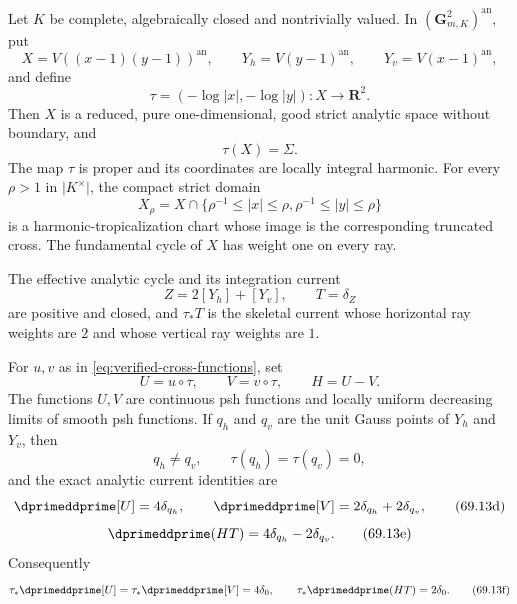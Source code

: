 \begin{proposition}
\label{prop:verified-cross-analytic-realization}
Let \(K\) be complete, algebraically closed and nontrivially valued.  In
\((\mathbf G_{m,K}^2)^{\mathrm{an}}\), put
\[
 X=V((x-1)(y-1))^{\mathrm{an}},
 \qquad
 Y_h=V(y-1)^{\mathrm{an}},
 \qquad
 Y_v=V(x-1)^{\mathrm{an}},
\]
and define
\[
 \tau=(-\log|x|,-\log|y|):X\longrightarrow\mathbf R^2.
\]
Then \(X\) is a reduced, pure one-dimensional, good strict analytic space
without boundary, and
\[
                         \tau(X)=\Sigma.
\tag{69.13a}\label{eq:verified-cross-analytic-image}
\]
The map \(\tau\) is proper and its coordinates are locally integral
harmonic.  For every \(\rho>1\) in \(\lvert K^\times\rvert\), the compact
strict domain
\[
 X_\rho=X\cap
 \{\rho^{-1}\leq|x|\leq\rho,
   \rho^{-1}\leq|y|\leq\rho\}
\tag{69.13b}\label{eq:verified-cross-truncation}
\]
is a harmonic-tropicalization chart whose image is the corresponding
truncated cross.  The fundamental cycle of \(X\) has weight one on every
ray.

The effective analytic cycle and its integration current
\[
                    Z=2[Y_h]+[Y_v],
        \qquad      T=\delta_Z
\tag{69.13c}\label{eq:verified-cross-cycle}
\]
are positive and closed, and \(\tau_*T\) is the skeletal current whose
horizontal ray weights are \(2\) and whose vertical ray weights are \(1\).

For \(u,v\) as in \eqref{eq:verified-cross-functions}, set
\[
                        U=u\circ\tau,\qquad
                        V=v\circ\tau,\qquad H=U-V.
\]
The functions \(U,V\) are continuous psh functions and locally uniform
decreasing limits of smooth psh functions.  If \(q_h\) and \(q_v\) are the
unit Gauss points of \(Y_h\) and \(Y_v\), then
\[
 q_h\ne q_v,\qquad \tau(q_h)=\tau(q_v)=0,
\]
and the exact analytic current identities are
\[
 \dprimeddprime[U]=4\delta_{q_h},
 \qquad
 \dprimeddprime[V]=2\delta_{q_h}+2\delta_{q_v},
\tag{69.13d}\label{eq:verified-cross-upstairs-curvatures}
\]
\[
                  \dprimeddprime(HT)
                    =4\delta_{q_h}-2\delta_{q_v}.
\tag{69.13e}\label{eq:verified-cross-upstairs-defect}
\]
Consequently
\[
 \tau_*\dprimeddprime[U]
 =\tau_*\dprimeddprime[V]
 =4\delta_0,
 \qquad
 \tau_*\dprimeddprime(HT)=2\delta_0.
\tag{69.13f}\label{eq:verified-cross-pushed-identities}
\]
\end{proposition}

